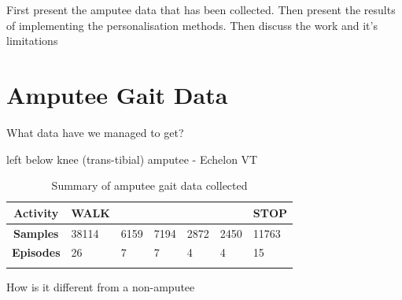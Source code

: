 First present the amputee data that has been collected. Then present the results of implementing the personalisation methods. Then discuss the work and it's limitations

\section{Amputee Gait Data}
What data have we managed to get? 

left below knee (trans-tibial) amputee - Echelon VT

\begin{table}[hbt]
    \centering
    \caption{Summary of amputee gait data collected}
    \label{tab:summary-of-episode-amputee-data}
    \begin{tabularx}{\textwidth}{c *{6}{Y}}
        \textbf{Activity} & WALK &  &  &  &  & STOP \\
        \hline
        \textbf{Samples} & 38114 & 6159 & 7194 &2872 & 2450 & 11763 \\
        \textbf{Episodes} & 26 & 7 & 7 & 4 & 4 & 15 \\
         \\
    \end{tabularx}
\end{table}

How is it different from a non-amputee

